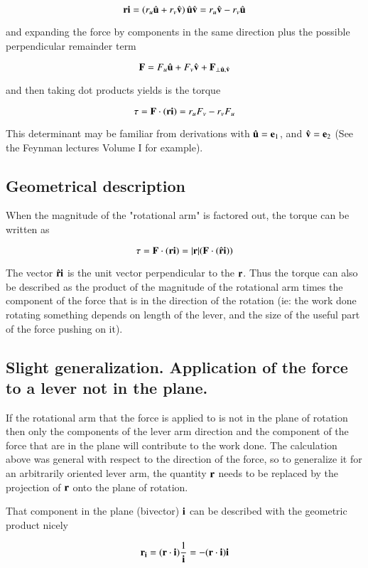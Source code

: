 \documentclass{article}      %
\begin{document}
\[
\mathbf{r} \mathbf{i} =
\left(
r_u \hat{\mathbf{u}} + r_v \hat{\mathbf{v}}
\right)
\hat{\mathbf{u}} \hat{\mathbf{v}}
= 
r_u \hat{\mathbf{v}}  
- r_v \hat{\mathbf{u}}
\]

and expanding the force by components in the same direction plus the possible perpendicular remainder term

\[
\mathbf{F}  = F_u \hat{\mathbf{u}} + F_v \hat{\mathbf{v}} + \mathbf{F} _{\perp \hat{\mathbf{u}},\hat{\mathbf{v}}}
\]

and then taking dot products yields is the torque

\[
\tau = \mathbf{F} \cdot (\mathbf{r}  \mathbf{i} ) = r_u F_v - r_v F_u
\]

This determinant may be familiar from derivations with $\hat{\mathbf{u}} = \mathbf{e} _1$, and $\hat{\mathbf{v}} = \mathbf{e} _2$ (See the Feynman lectures Volume I for example).

\subsection{Geometrical description }

When the magnitude of the "rotational arm" is factored out, the torque can be written as

\[
\tau = \mathbf{F} \cdot (\mathbf{r}  \mathbf{i} ) = |\mathbf{r} |  (\mathbf{F} \cdot (\hat{\mathbf{r}} \mathbf{i} ))
\]

The vector $\hat{\mathbf{r}} \mathbf{i} $ is the unit vector perpendicular to the $\mathbf{r}$.  Thus the torque can also be described as the product of the magnitude of the rotational arm times the component of the force that is in the direction of the rotation (ie: the work done rotating something depends on length of the lever, and the size of the useful part of the force pushing on it).

\subsection{Slight generalization.  Application of the force to a lever not in the plane. }

If the rotational arm that the force is applied to is not in the plane of rotation then only the components of the lever arm direction and the component of the force that are in the plane will contribute to the work done.  The calculation above was general with respect to the direction of the force, so to generalize
it for an arbitrarily oriented lever arm, the quantity $\mathbf{r}$ needs to be replaced by the projection of $\mathbf{r}$ onto the plane of rotation.

That component in the plane (bivector) $\mathbf{i}$ can be described with the geometric product nicely

\[
\mathbf{r} _{\mathbf{i} } =  (\mathbf{r}  \cdot \mathbf{i} ) \frac{1}{\mathbf{i} } =  -(\mathbf{r}  \cdot \mathbf{i} ) \mathbf{i} 
\]
\end{document}
